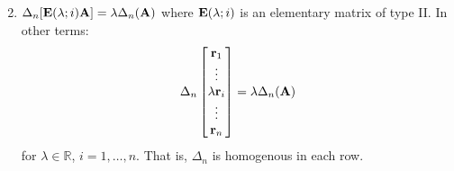 \documentclass{article}
\begin{document}
    \begin{minipage}[t]{0.45\linewidth}
        \begin{enumerate}[label=D\Roman*]
            \setcounter{enumi}{1}
            \item $\Delta_n[\mathbf{E}(\lambda;i)\mathbf{A}] = \lambda \Delta_n(\mathbf{A})$ where $\mathbf{E}(\lambda;i)$ is an elementary matrix of type II. In other terms:
            \begin{equation*}
                \Delta_n\begin{bmatrix}
                    \mathbf{r}_1 \\ \vdots \\ \lambda \mathbf{r}_i \\ \vdots \\ \mathbf{r}_n
                \end{bmatrix} = \lambda \Delta_n(\mathbf{A})
            \end{equation*}
            for $\lambda \in \mathbb{R}$, $i=1,\dots, n$. That is, $\Delta_n$ is homogenous in each row.
        \end{enumerate}
        \vspace{2mm}


\end{minipage}
\end{document}
